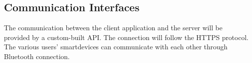\subsection{Communication Interfaces}
The communication between the client application and the server will be provided by a custom-built API.
The connection will follow the HTTPS protocol. The various users' smartdevices can communicate with each other through Bluetooth connection.
